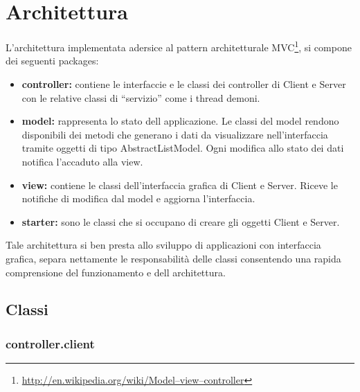 \documentclass[
10pt, %
a4paper, %
oneside, %
BCOR5mm, %
]{scrartcl}
\begin{document}

\section{Architettura}
	
	L'architettura implementata adersice al pattern architetturale MVC\footnote{\href{http://en.wikipedia.org/wiki/Model–view–controller}{http://en.wikipedia.org/wiki/Model–view–controller}}, si compone dei seguenti packages:

		\begin{itemize}
			\item \textbf{controller:} contiene le interfaccie e le classi dei controller di Client e Server con le relative classi di ``servizio'' come i thread demoni.
			\item \textbf{model:} rappresenta lo stato dell applicazione. Le classi del model rendono disponibili dei metodi che generano i dati da visualizzare nell'interfaccia tramite oggetti di tipo AbstractListModel. Ogni modifica allo stato dei dati notifica l'accaduto alla view.
			\item \textbf{view:} contiene le classi dell'interfaccia grafica di Client e Server. Riceve le notifiche di modifica dal model e aggiorna l'interfaccia.
			\item \textbf{starter:} sono le classi che si occupano di creare gli oggetti Client e Server.
		\end{itemize}

	Tale architettura si ben presta allo sviluppo di applicazioni con interfaccia grafica, separa nettamente le responsabilità delle classi consentendo una rapida comprensione del funzionamento e dell architettura.
	 
	\subsection{Classi}
 		
 		\subsubsection{controller.client}
 				
\end{document}
